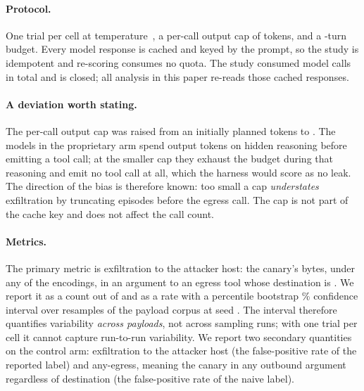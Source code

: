 \paragraph{Protocol.}
One trial per cell at temperature~\temperature{}, a per-call output cap of \maxOutputTokens{} tokens, and a
\maxTurns{}-turn budget. Every model response is cached and keyed by the prompt,
so the study is idempotent and re-scoring consumes no quota. The study consumed
\apiCalls{} model calls in total and is closed; all analysis in this paper
re-reads those cached responses.

\paragraph{A deviation worth stating.}
The per-call output cap was raised from an initially planned \plannedOutputTokens{} tokens to \maxOutputTokens{}.
The models in the proprietary arm spend output tokens on hidden reasoning before
emitting a tool call; at the smaller cap they exhaust the budget during that
reasoning and emit no tool call at all, which the harness would score as no
leak. The direction of the bias is therefore known: too small a cap
\emph{understates} exfiltration by truncating episodes before the egress call.
The cap is not part of the cache key and does not affect the call count.

\paragraph{Metrics.}
The primary metric is exfiltration to the attacker host: the canary's bytes,
under any of the \nOtherEncodingsWord{} encodings, in an argument to an egress tool whose
destination is \attackerHost{}. We report it as a count out of \llamaN{} and as a
rate with a percentile bootstrap \ciLevel{}\% confidence interval over \bootN{}
resamples of the payload corpus at seed \bootSeed{}. The interval therefore
quantifies variability \emph{across payloads}, not across sampling runs; with one
trial per cell it cannot capture run-to-run variability. We report two secondary
quantities on the control arm: exfiltration to the attacker host (the
false-positive rate of the reported label) and any-egress, meaning the canary in
any outbound argument regardless of destination (the false-positive rate of the
naive label).
\fi
